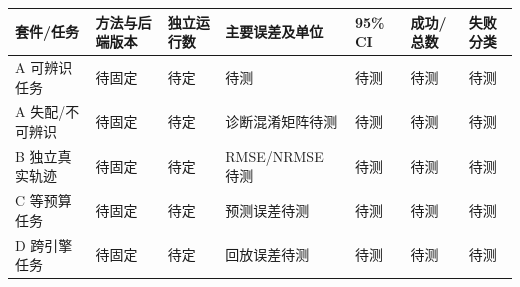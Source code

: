 \documentclass[
  chinese,
  11pt,
  a4paper,
  fontset=fandol]{ctexart}
\newcounter{none} %
\begin{document}
{\def\LTcaptype{none} %
\begin{longtable}[]{@{}
  >{\raggedright\arraybackslash}p{}
  >{\raggedright\arraybackslash}p{}
  >{\raggedright\arraybackslash}p{}
  >{\raggedright\arraybackslash}p{}
  >{\raggedright\arraybackslash}p{}
  >{\raggedright\arraybackslash}p{}
  >{\raggedright\arraybackslash}p{}@{}}
\toprule\noalign{}
\begin{minipage}[b]{\linewidth}\raggedright
套件/任务
\end{minipage} & \begin{minipage}[b]{\linewidth}\raggedright
方法与后端版本
\end{minipage} & \begin{minipage}[b]{\linewidth}\raggedright
独立运行数
\end{minipage} & \begin{minipage}[b]{\linewidth}\raggedright
主要误差及单位
\end{minipage} & \begin{minipage}[b]{\linewidth}\raggedright
95\% CI
\end{minipage} & \begin{minipage}[b]{\linewidth}\raggedright
成功/总数
\end{minipage} & \begin{minipage}[b]{\linewidth}\raggedright
失败分类
\end{minipage} \\
\midrule\noalign{}
\endhead
\bottomrule\noalign{}
\endlastfoot
A 可辨识任务 & 待固定 & 待定 & 待测 & 待测 & 待测 & 待测 \\
A 失配/不可辨识 & 待固定 & 待定 & 诊断混淆矩阵待测 & 待测 & 待测 &
待测 \\
B 独立真实轨迹 & 待固定 & 待定 & RMSE/NRMSE 待测 & 待测 & 待测 & 待测 \\
C 等预算任务 & 待固定 & 待定 & 预测误差待测 & 待测 & 待测 & 待测 \\
D 跨引擎任务 & 待固定 & 待定 & 回放误差待测 & 待测 & 待测 & 待测 \\
\end{longtable}
}
\end{document}
